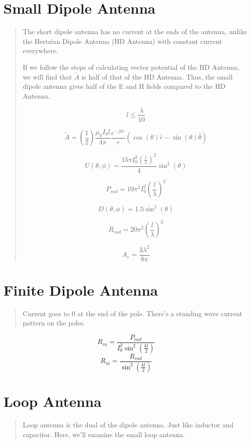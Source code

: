 \documentclass{article} %
\begin{document}
\section{Small Dipole Antenna}

\begin{quote}
    The short dipole antenna has no current at the ends of the antenna, unlike the Hertzian Dipole Antenna (HD Antenna) with constant current everywhere.

    If we follow the steps of calculating vector potential of the HD Antenna, we will find that $\tilde{A}$ is half of that of the HD Antenna. Thus, the small dipole antenna gives half of the E and H fields compared to the HD Antenna.

    \[l \leq \frac{\lambda}{10}\]

    \[\tilde{A} = \left(\frac{1}{2}\right)\frac{\mu_0 I_0 l}{4 \pi}\frac{e^{-jkr}}{r}(\cos(\theta) \hat{r} -\sin(\theta) \hat{\theta})\]

    \[U(\theta, \phi) = \frac{15 \pi I_0 ^2\left(\frac{l}{\lambda}\right)^2}{4} \sin^2(\theta)\]

    \[P_{rad} = 10 \pi^2 I_0^2 \left(\frac{l}{\lambda}\right)^2\]

    \[D(\theta, \phi) = 1.5 \sin^2(\theta)\]

    \[R_{rad} = 20 \pi^2 \left(\frac{l}{\lambda}\right)^2\]

    \[A_e = \frac{3 \lambda ^2}{8 \pi}\]
\end{quote}

\section{Finite Dipole Antenna}
\begin{quote}
    Current goes to 0 at the end of the pole. There's a standing wave current pattern on the poles.
\end{quote}


\[R_{in} = \frac{P_{rad}}{I_0^2 \sin^2\left(\frac{kl}{2}\right)}\]
\[R_{in} = \frac{R_{rad}}{\sin^2\left(\frac{kl}{2}\right)}\]


\section{Loop Antenna}
\begin{quote}
    Loop antenna is the dual of the dipole antenna. Just like inductor and capacitor.
    Here, we'll examine the small loop antenna.
\end{quote}
\end{document}
